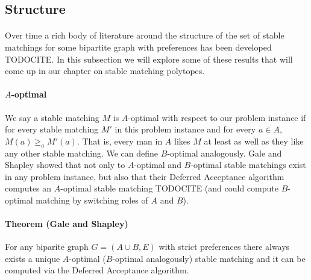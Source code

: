 \subsection{Structure}
\paragraph{}
Over time a rich body of literature around the structure of the set of stable matchings for some bipartite graph with preferences has been developed TODOCITE. In this subsection we will explore some of these results that will come up in our chapter on stable matching polytopes.
\paragraph{$A$-optimal} We say a stable matching $M$ is $A$-optimal with respect to our problem instance if for every stable matching $M'$ in this problem instance and for every $a \in A$, $M(a) \geq_a M'(a)$. That is, every man in $A$ likes $M$ at least as well as they like any other stable matching. We can define $B$-optimal analogously. Gale and Shapley showed that not only to $A$-optimal and $B$-optimal stable matchings exist in any problem instance, but also that their Deferred Acceptance algorithm computes an $A$-optimal stable matching TODOCITE (and could compute $B$-optimal matching by switching roles of $A$ and $B$).
\paragraph{Theorem (Gale and Shapley)} For any biparite graph $G = (A\cup B, E)$ with strict preferences there always exists a unique $A$-optimal ($B$-optimal analogously) stable matching and it can be computed via the Deferred Acceptance algorithm.
